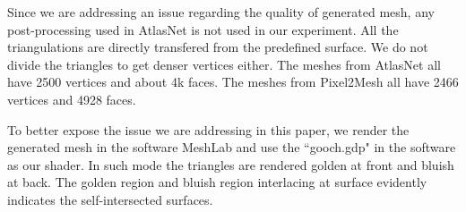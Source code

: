  Since we are addressing an issue regarding the quality of generated mesh, any post-processing used in AtlasNet \cite{atlasnet} is not used in our experiment. All the triangulations are directly transfered from the predefined surface. We do not divide the triangles to get denser vertices either. The meshes from AtlasNet all have 2500 vertices and about 4k faces. The meshes from Pixel2Mesh all have 2466 vertices and 4928 faces.

To better expose the issue we are addressing in this paper, we render the generated mesh in the software MeshLab and use the ``gooch.gdp" in the software as our shader. In such mode the triangles are rendered golden at front and bluish at back. The golden region and bluish region interlacing at surface evidently indicates the self-intersected surfaces.

